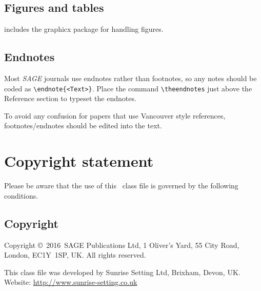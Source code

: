 \documentclass[Afour,sageh,times]{sagej}
\def\volumeyear{2016}
\begin{document}
\subsection{Figures and tables} \textsf{\journalclass} includes the
\textsf{graphicx} package for handling figures.




\subsection{Endnotes}
Most \textit{SAGE} journals use endnotes rather than footnotes, so any notes should be coded as \verb+\endnote{<Text>}+.
Place the command \verb+\theendnotes+ just above the Reference section to typeset the endnotes.

To avoid any confusion for papers that use Vancouver style references,  footnotes/endnotes should be edited into the text.


\section{Copyright statement}
Please  be  aware that the use of  this \LaTeXe\ class file is
governed by the following conditions.

\subsection{Copyright}
Copyright \copyright\ \volumeyear\ SAGE Publications Ltd,
1 Oliver's Yard, 55 City Road, London, EC1Y~1SP, UK. All
rights reserved.


\begin{acks}
This class file was developed by Sunrise Setting Ltd,
Brixham, Devon, UK.\\
Website: \url{http://www.sunrise-setting.co.uk}
\end{acks}




\end{document}
